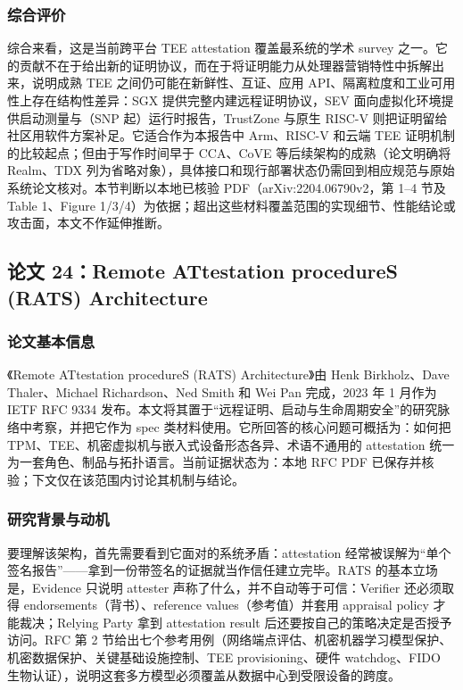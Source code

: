 \documentclass[11pt]{ctexart}
\begin{document}
\subsubsection{综合评价}
综合来看，这是当前跨平台 TEE attestation 覆盖最系统的学术 survey 之一。它的贡献不在于给出新的证明协议，而在于将证明能力从处理器营销特性中拆解出来，说明成熟 TEE 之间仍可能在新鲜性、互证、应用 API、隔离粒度和工业可用性上存在结构性差异：SGX 提供完整内建远程证明协议，SEV 面向虚拟化环境提供启动测量与（SNP 起）运行时报告，TrustZone 与原生 RISC-V 则把证明留给社区用软件方案补足。它适合作为本报告中 Arm、RISC-V 和云端 TEE 证明机制的比较起点；但由于写作时间早于 CCA、CoVE 等后续架构的成熟（论文明确将 Realm、TDX 列为省略对象），具体接口和现行部署状态仍需回到相应规范与原始系统论文核对。本节判断以本地已核验 PDF（arXiv:2204.06790v2，第 1–4 节及 Table 1、Figure 1/3/4）为依据；超出这些材料覆盖范围的实现细节、性能结论或攻击面，本文不作延伸推断。\par

\subsection{论文 24：Remote ATtestation procedureS (RATS) Architecture}
\subsubsection{论文基本信息}
《Remote ATtestation procedureS (RATS) Architecture》由 Henk Birkholz、Dave Thaler、Michael Richardson、Ned Smith 和 Wei Pan 完成，2023 年 1 月作为 IETF RFC 9334 发布。本文将其置于“远程证明、启动与生命周期安全”的研究脉络中考察，并把它作为 spec 类材料使用。它所回答的核心问题可概括为：如何把 TPM、TEE、机密虚拟机与嵌入式设备形态各异、术语不通用的 attestation 统一为一套角色、制品与拓扑语言。当前证据状态为：本地 RFC PDF 已保存并核验；下文仅在该范围内讨论其机制与结论。\cite{rats_rfc}\par
\subsubsection{研究背景与动机}
要理解该架构，首先需要看到它面对的系统矛盾：attestation 经常被误解为“单个签名报告”——拿到一份带签名的证据就当作信任建立完毕。RATS 的基本立场是，Evidence 只说明 attester 声称了什么，并不自动等于可信：Verifier 还必须取得 endorsements（背书）、reference values（参考值）并套用 appraisal policy 才能裁决；Relying Party 拿到 attestation result 后还要按自己的策略决定是否授予访问。RFC 第 2 节给出七个参考用例（网络端点评估、机密机器学习模型保护、机密数据保护、关键基础设施控制、TEE provisioning、硬件 watchdog、FIDO 生物认证），说明这套多方模型必须覆盖从数据中心到受限设备的跨度。\par
\end{document}
